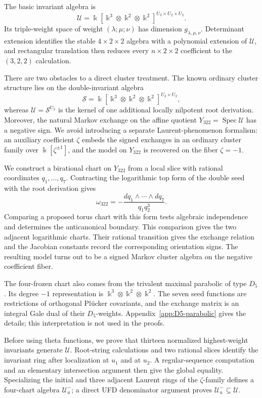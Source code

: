 \documentclass[11pt,reqno]{amsart}
\numberwithin{equation}{section}
\theoremstyle{remark}
\newcommand{\kk}{\Bbbk}
\newcommand{\SR}{\mathscr S}
\newcommand{\UR}{\mathscr U}
\newcommand{\Uneg}{\mathcal U_u^{-}}
\newcommand{\Spec}{\operatorname{Spec}}
\begin{document}
The basic invariant algebra is
\[ \UR=\kk[\kk^3\otimes\kk^2\otimes\kk^2]^{U_3\times U_2\times U_2}. \]
Its triple-weight space of weight $(\lambda;\mu;\nu)$ has dimension
$g_{\lambda,\mu,\nu}$.  Determinant extension identifies the stable
$4\times2\times2$ algebra with a polynomial extension of $\UR$, and
rectangular translation then reduces every $n\times2\times2$ coefficient
to the $(3,2,2)$ calculation.

There are two obstacles to a direct cluster treatment.  The known ordinary
cluster structure lies on the double-invariant algebra
\[ \SR =\kk[\kk^3\otimes\kk^2\otimes\kk^2]^{U_3\times U_2}, \]
whereas $\UR=\SR^{U_2}$ is the kernel of one additional locally nilpotent
root derivation.  Moreover, the natural Markov exchange on the affine
quotient $Y_{322}=\Spec\UR$ has a negative sign.  We avoid introducing a
separate Laurent-phenomenon formalism: an auxiliary coefficient $\zeta$
embeds the signed exchanges in an ordinary cluster family over
$\kk[\zeta^{\pm1}]$, and the model on $Y_{322}$ is recovered on the fiber
$\zeta=-1$.

We construct a birational chart on $Y_{322}$ from a local slice with
rational coordinates $q_1,\ldots,q_7$.  Contracting the logarithmic top form
of the double seed
with the root derivation gives
\[ \omega_{322} =-\frac{dq_1\wedge\cdots\wedge dq_7}{q_1q_2^3}. \]
Comparing a proposed torus chart with this form tests algebraic independence
and determines the anticanonical boundary. This comparison gives the two
adjacent logarithmic charts.
Their rational transition gives the exchange relation
and the Jacobian constants record the corresponding orientation signs.
The resulting model turns out to be a signed Markov cluster algebra on the negative coefficient fiber.

The four-frozen chart also comes from the trivalent maximal parabolic of type
$D_5$.  Its degree $-1$ representation is
$\kk^3\otimes\kk^2\otimes\kk^2$.  The seven seed functions are restrictions
of orthogonal Pl\"ucker covariants, and the exchange matrix is an integral
Gale dual of their $D_5$-weights.  Appendix~\ref{app:D5-parabolic} gives the
details; this interpretation is not used in the proofs.

Before using theta functions, we prove that thirteen normalized
highest-weight invariants generate $\UR$.  Root-string calculations and two
rational slices identify the invariant ring after localization at $u_1$ and
at $u_2$.  A regular-sequence computation and an elementary
intersection argument then give the global equality.  Specializing the initial
and three adjacent Laurent rings of the $\zeta$-family defines a four-chart algebra
$\Uneg$; a direct UFD denominator argument proves
$\Uneg\subseteq\UR$.
\end{document}
